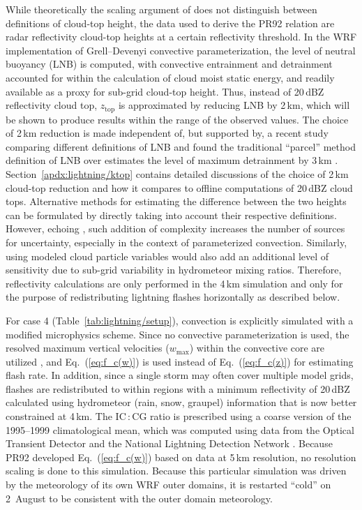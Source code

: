 While theoretically the scaling argument of \citet{Vonnegut:1963aa} does not
distinguish between definitions of cloud-top height, the data used to derive
the PR92 relation are radar reflectivity cloud-top heights at a certain
reflectivity threshold. In the WRF implementation of Grell--Devenyi convective
parameterization, the level of neutral buoyancy (LNB) is computed, with
convective entrainment and detrainment accounted for within the calculation
of cloud moist static energy, and readily available as a proxy for sub-grid
cloud-top height. Thus, instead of 20\,\unit{dBZ} reflectivity cloud top,
$z_{\mathrm{top}}$ is approximated by reducing LNB by 2\,\unit{km}, which
will be shown to produce results within the range of the observed values. The
choice of 2\,\unit{km} reduction is made independent of, but supported by, a
recent study comparing different definitions of LNB and found the traditional
``parcel'' method definition of LNB over estimates the level of maximum
detrainment by 3\,\unit{km} \citep{Takahashi:2012uq}. Section~\ref{apdx:lightning/ktop}
contains detailed discussions of the choice of 2\,\unit{km}
cloud-top reduction and how it compares to offline computations of
20\,\unit{dBZ} cloud tops. Alternative methods for estimating the difference
between the two heights can be formulated by directly taking into account
their respective definitions. However, echoing \cite{Barthe:2010uq}, such
addition of complexity increases the number of sources for uncertainty,
especially in the context of parameterized convection. Similarly, using
modeled cloud particle variables would also add an additional level of
sensitivity due to sub-grid variability in hydrometeor mixing ratios.
Therefore, reflectivity calculations are only performed in the 4\,\unit{km}
simulation and only for the purpose of redistributing lightning flashes
horizontally as described below.

For case 4 (Table~\ref{tab:lightning/setup}), convection is explicitly simulated with a
modified \citet{Lin:1983zr} microphysics scheme. Since no convective
parameterization is used, the resolved maximum vertical velocities
($w_{\max}$) within the convective core are utilized \citep{Barth:2012qf},
and Eq.~(\ref{eq:f_c(w)}) is used instead of Eq.~(\ref{eq:f_c(z)}) for
estimating flash rate. In addition, since a single storm may often cover
multiple model grids, flashes are redistributed to within regions with a
minimum reflectivity of 20\,\unit{dBZ} calculated using hydrometeor (rain,
snow, graupel) information that is now better constrained at 4\,\unit{km}.
The IC\,:\,CG ratio is prescribed using a coarse version of the
\cite{Boccippio:2001ys} 1995--1999 climatological mean, which was computed
using data from the Optical Transient Detector
\citep[OTD;][]{Boccippio:2000mi} and the National Lightning Detection Network
\citep[NLDN;][]{Cummins:2009aa}. Because PR92 developed Eq.~(\ref{eq:f_c(w)}) based
on data at 5\,\unit{km} resolution, no resolution scaling is done to this
simulation. Because this particular simulation was driven by the meteorology
of its own WRF outer domains, it is restarted ``cold'' on 2~August to be
consistent with the outer domain meteorology.

